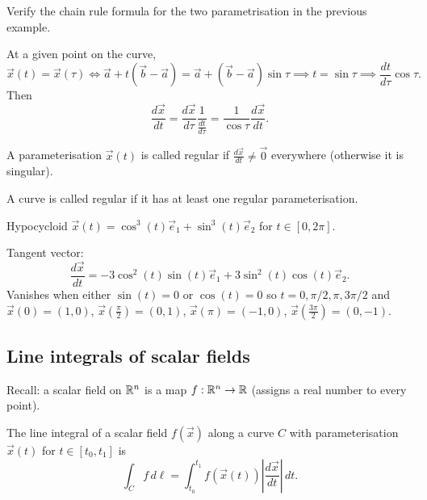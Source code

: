 \documentclass[10pt, a4paper]{article}
\begin{document}
\begin{example}
    Verify the chain rule formula for the two parametrisation in the previous example.

    At a given point on the curve,
    \[
    \vec{x}(t) = \vec{x}(\tau) \iff \vec{a} + t(\vec{b} - \vec{a}) = \vec{a} + (\vec{b} - \vec{a})\sin{\tau} \implies t = \sin{\tau} \implies \frac{dt}{d\tau}\cos{\tau}.
    \]
    Then
    \[
    \frac{d\vec{x}}{dt} = \frac{d\vec{x}}{d\tau}\frac{1}{\frac{dt}{d\tau}} = \frac{1}{\cos{\tau}}\frac{d\vec{x}}{dt}.
    \]
\end{example}

\begin{remark}
    A parameterisation $\vec{x}(t)$ is called regular if $\frac{d\vec{x}}{dt} \neq \vec{0}$ everywhere
    (otherwise it is singular).
    
    A curve is called regular if it has at least one regular parameterisation.
\end{remark}

\begin{example}
    Hypocycloid $\vec{x}(t) = \cos ^ 3(t)\vec{e}_1 + \sin ^ 3(t)\vec{e}_2$ for $t \in [0, 2\pi]$.

    Tangent vector:
    \[
    \frac{d\vec{x}}{dt} = -3\cos ^ 2(t)\sin(t)\vec{e}_1 + 3\sin ^ 2(t)\cos(t)\vec{e}_2.
    \]
    Vanishes when either $\sin(t) = 0$ or $\cos(t) = 0$ so $t = 0, \pi / 2, \pi, 3\pi / 2$ and $\vec{x}(0) = (1, 0)$,
    $\vec{x}\left(\frac{\pi}{2}\right) = (0, 1)$,
    $\vec{x}(\pi) = (-1, 0)$,
    $\vec{x}\left(\frac{3\pi}{2}\right) = (0, -1)$.
\end{example}

\subsection{Line integrals of scalar fields}

Recall:
a scalar field on $\mathbb{R} ^ n$ is a map $f : \mathbb{R} ^ n \to \mathbb{R}$
(assigns a real number to every point).

The line integral of a scalar field $f(\vec{x})$ along a curve $C$ with parameterisation $\vec{x}(t)$ for $t \in [t_0, t_1]$ is
\[
\int_{C}f\,d\ell = \int_{t_0}^{t_1}f(\vec{x}(t))\left|\frac{d\vec{x}}{dt}\right|\,dt.
\]
\end{document}
